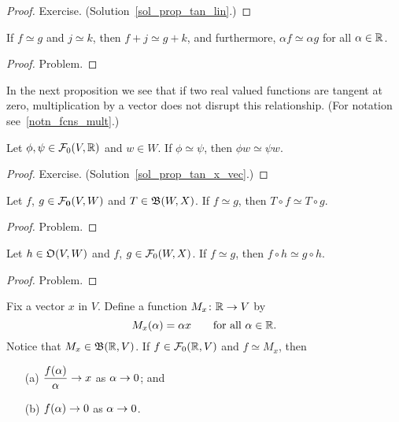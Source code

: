 \begin{proof} Exercise.  (Solution~\ref{sol_prop_tan_lin}.) \ns   \end{proof}

\begin{prop}\label{prop_tan_sum}  If $f \simeq g$ and $j \simeq k$, then $f + j \simeq g + k$,
and furthermore, $\alpha f \simeq \alpha g$ for all $\alpha \in \mathbb{R}$.
\end{prop}

\begin{proof} Problem.  \ns   \end{proof}

In the next proposition we see that if two real valued functions are tangent at zero,
multiplication by a vector does not disrupt this relationship.  (For notation
see~\ref{notn_fcns_mult}.)

\begin{prop}\label{prop_tan_x_vec}  Let $\phi, \psi \in \mathcal{F}_0(V,\mathbb{R})$ and $w \in W$.  If
$\phi \simeq \psi$, then $\phi w \simeq \psi w$.
\end{prop}

\begin{proof} Exercise.  (Solution~\ref{sol_prop_tan_x_vec}.)  \ns   \end{proof}

\begin{prop}\label{prop_lin_comp_tan}  Let $f$, $g \in \mathcal{F}_{\mathbf{0}}(V,W)$ and $T \in
\mathfrak{B}(W,X)$.  If $f \simeq g$, then $T \circ f \simeq T \circ g$.
\end{prop}

\begin{proof} Problem.  \ns   \end{proof}

\begin{prop}\label{prop_tan_comp_O}  Let $h \in \mathfrak{O}(V,W)$ and $f$, $g \in \mathcal{F}_0(W,X)$.
If $f \simeq g$, then $f \circ h \simeq g \circ h$.
\end{prop}

\begin{proof} Problem.  \ns   \end{proof}

\begin{prob}  Fix a vector $x$ in $V$. Define a function $M_x \colon \mathbb{R} \rightarrow V$ by
  \[ M_x(\alpha)=\alpha x \qquad \text{for all $\alpha \in \mathbb{R}$.} \]
Notice that $M_x \in \mathfrak{B}(\mathbb{R},V)$.  If $f \in \mathcal{F}_0(\mathbb{R},V)$ and $f \simeq M_x$, then
 \begin{enumerate}
  \item[(a)] $\dfrac{f(\alpha)}{\alpha} \rightarrow x$ as $\alpha \rightarrow 0$;
and
  \item[(b)] $f(\alpha) \rightarrow 0$ as $\alpha \rightarrow 0$.
 \end{enumerate}
\end{prob}

